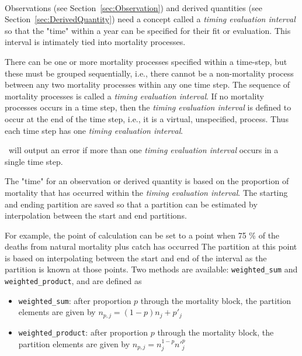 \paragraph{}\label{sec:MortalityBlock}\label{sec:TimingEvaluationInterval}


Observations (see Section~\ref{sec:Observation})  and derived quantities (see Section~\ref{sec:DerivedQuantity}) need a concept called a \emph{timing evaluation interval} so that the "time" within a year can be specified for their fit or evaluation. This interval is intimately tied into mortality processes.

There can be one or more mortality processes specified within a time-step, but these must  be grouped sequentially, i.e., there cannot be a non-mortality process between any two mortality processes within any one time step. The sequence of mortality processes is called a \emph{timing evaluation interval}.  If no mortality processes occurs in a time step, then the \emph{timing evaluation interval} is defined to occur at the end of the time step, i.e., it is a virtual, unspecified,  process. Thus  each time step has one \emph{timing evaluation interval}.

\CNAME\ will output an error if more than one \textit{timing evaluation interval} occurs in a single time step.

The "time" for an observation or derived quantity is based on the proportion of mortality that has occurred within the \textit{timing evaluation interval}. The starting and ending partition are saved so that a partition can be estimated by  interpolation between the start and end partitions.

For example, the point of calculation can be set to a point  when 75 \% of the deaths from natural mortality plus catch has occurred The partition at this point is based on interpolating between the start and end of the interval as the partition is known at those points.  Two  methods are available: \texttt{weighted\_sum} and \texttt{weighted\_product}, and are defined as

\begin{itemize}
	\item \texttt{weighted\_sum}: after proportion $p$ through the mortality block, the partition elements are given by $n_{p,j} = (1 - p)n_j + p'_j$

	\item \texttt{weighted\_product}: after proportion $p$ through the mortality block, the partition elements are given by $n_{p,j} = n_j^{1-p} n'^p_j$
\end{itemize}

